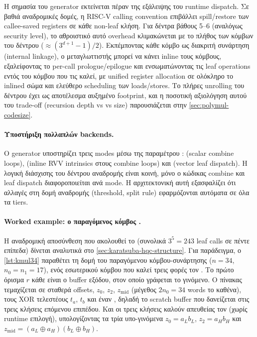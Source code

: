 Η σημασία του generator εκτείνεται πέραν της εξάλειψης του runtime
dispatch. Σε βαθιά αναδρομικές δομές, η RISC-V calling convention
επιβάλλει spill/restore των callee-saved registers σε κάθε non-leaf
κλήση. Για δέντρα βάθους 5–6 (αναλόγως security level), το αθροιστικό
αυτό overhead κλιμακώνεται με το πλήθος των κόμβων του δέντρου
($\approx (3^{d+1}-1)/2$). Εκπέμποντας κάθε κόμβο ως διακριτή
 συνάρτηση (internal linkage), ο μεταγλωττιστής μπορεί να κάνει inline τους κόμβους,
εξαλείφοντας το per-call prologue/epilogue και ενσωματώνοντας τις leaf
operations εντός του κόμβου που τις καλεί, με unified register allocation
σε ολόκληρο το inlined σώμα και ελεύθερο scheduling των loads/stores.
\ifTODO Το πλήρες unrolling του δέντρου
έχει ως αποτέλεσμα αυξημένο  footprint, και η ποσοτική αξιολόγηση
αυτού του trade-off (recursion depth vs \instret vs  size)
παρουσιάζεται στην \cref{sec:polymul-codesize}.\fi

\paragraph{Υποστήριξη πολλαπλών backends.}
Ο generator υποστηρίζει τρεις modes μέσω της παραμέτρου
:  (scalar combine loops), 
(inline RVV intrinsics στους combine loops) και  (vector
leaf dispatch). Η λογική διάσχισης του δέντρου
αναδρομής είναι κοινή, μόνο ο κώδικας combine και leaf dispatch
διαφοροποιείται ανά mode. Η αρχιτεκτονική αυτή εξασφαλίζει ότι
αλλαγές στη δομή αναδρομής (threshold, split rule) εφαρμόζονται
αυτόματα σε όλα τα tiers.

\paragraph{Worked example: ο παραγόμενος κόμβος .}
Η αναδρομική αποσύνθεση που ακολουθεί το  (συνολικά
$3^5 = \num{243}$ leaf calls σε πέντε επίπεδα) δίνεται αναλυτικά
στο \cref{sec:karatsuba-hqc-structure}. Για παράδειγμα, ο \cref{lst:kmul34} παραθέτει τη δομή του παραγόμενου
κόμβου-συνάρτησης  ($n = 34$, $n_0 = n_1 = 17$), ενός
εσωτερικού κόμβου που καλεί τρεις φορές τον . Το πρώτο όρισμα
$r$ κάθε  είναι ο buffer εξόδου, στον οποίο γράφεται το γινόμενο.
Ο πίνακας
 τεμαχίζεται σε σταθερά offsets, $z_0$, $z_2$, $z_\text{mid}$
(μέγεθος $2n_0 = \num{34}$ words το καθένα), τους XOR τελεστέους $t_a$, $t_b$ και έναν
, δηλαδή το scratch buffer που δανείζεται στις τρεις
κλήσεις επόμενου επιπέδου. Και οι τρεις κλήσεις καλούν απευθείας τον
 (χωρίς runtime επιλογή), υπολογίζοντας τα τρία υπο-γινόμενα
$z_0 = a_L b_L$, $z_2 = a_H b_H$ και
$z_\text{mid} = (a_L \oplus a_H)(b_L \oplus b_H)$. 

